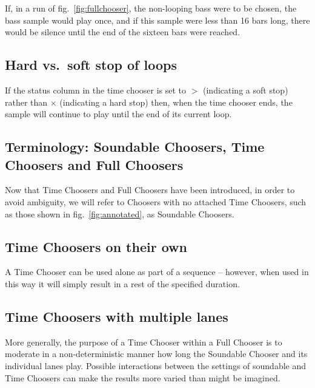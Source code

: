 \documentclass{ppig}
\begin{document}
If, in a run of fig.~\ref{fig:fullchooser}, the non-looping bass were to
be chosen, the bass sample would play once, and if this sample were less
than 16 bars long, there would be silence until the end of the sixteen
bars were reached.

\hypertarget{hard-vs.soft-stop-of-loops}{%
\subsection{Hard vs.~soft stop of
loops}\label{hard-vs.soft-stop-of-loops}}

If the status column in the time chooser is set to \(>\) (indicating a
soft stop) rather than \(\times\) (indicating a hard stop) then, when
the time chooser ends, the sample will continue to play until the end of
its current loop.

\hypertarget{terminology-soundable-choosers-time-choosers-and-full-choosers}{%
\subsection{Terminology: Soundable Choosers, Time Choosers and Full
Choosers}\label{terminology-soundable-choosers-time-choosers-and-full-choosers}}

Now that Time Choosers and Full Choosers have been introduced, in order
to avoid ambiguity, we will refer to Choosers with no attached Time
Choosers, such as those shown in fig.~\ref{fig:annotated}, as Soundable
Choosers.

\hypertarget{time-choosers-on-their-own}{%
\subsection{Time Choosers on their
own}\label{time-choosers-on-their-own}}

A Time Chooser can be used alone as part of a sequence -- however, when
used in this way it will simply result in a rest of the specified
duration.

\hypertarget{time-choosers-with-multiple-lanes}{%
\subsection{Time Choosers with multiple
lanes}\label{time-choosers-with-multiple-lanes}}

More generally, the purpose of a Time Chooser within a Full Chooser is
to moderate in a non-deterministic manner how long the Soundable Chooser
and its individual lanes play. Possible interactions between the
settings of soundable and Time Choosers can make the results more varied
than might be imagined.
\end{document}
